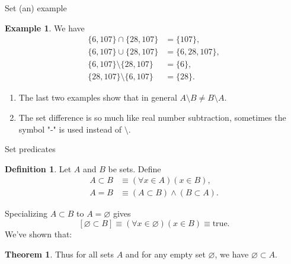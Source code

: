 \documentclass[fleqn]{beamer}
\theoremstyle{definition}
\newtheorem{mydef}{Definition}
\newtheorem{myex}{Example}
\newtheorem{myth}{Theorem}
\newenvironment{checklist}{
  \begin{enumerate}[\ding{51}]
    \addtolength{\itemsep}{-0.0\itemsep}}
  {\end{enumerate}}
\begin{document}
\begin{frame}{Set (an) example}

\begin{myex}
We have
\begin{align*}
   \{6, 107\} \cap  \{28,107\} &= \{107\}, \\
      \{6, 107\} \cup  \{28,107\} &= \{6,28, 107\}, \\
         \{6, 107\} \setminus  \{28,107\} &= \{6\}, \\
            \{28, 107\} \setminus  \{6,107\} &= \{28\}.
\end{align*}
\end{myex}

\begin{checklist}

\item The last two examples show that in  general  \(A \setminus B \neq B \setminus A\).

\item The set difference is so much like real number subtraction, sometimes the symbol "-" is used instead of \(\setminus\).

\end{checklist}
\end{frame}


\begin{frame}{Set predicates} 

\begin{mydef}
Let \(A\) and \(B\) be sets. Define
\begin{align*}
   A \subset B &\equiv (\forall x \in A)(x \in B),\\
   A = B &\equiv  (A \subset B) \land (B \subset A).
\end{align*}
\end{mydef}

Specializing \(A \subset B\) to \(A = \varnothing\) gives
\[
   \left[\varnothing \subset B \right] \equiv  (\forall x \in \varnothing)(x \in B) \equiv \mbox{true}.
\]
We've shown that: 

\begin{myth} Thus for all sets \(A\) and for any empty set \(\varnothing\), we have \(\varnothing \subset A\).  \end{myth}


\end{frame}
\end{document}
